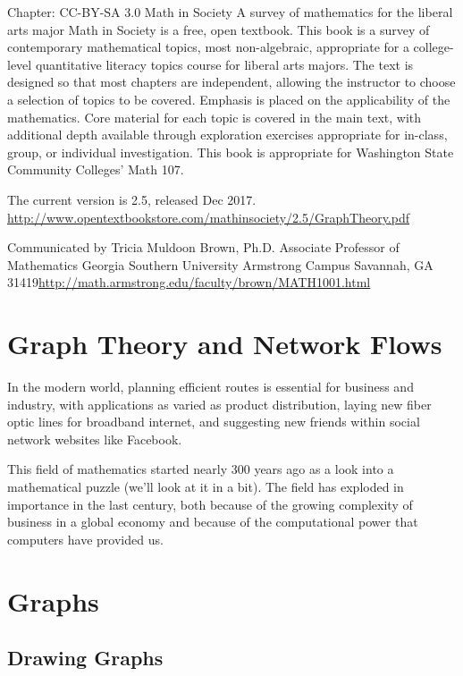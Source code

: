 \newcommand{\sout}{}
Chapter:
CC-BY-SA 3.0
Math in Society
A survey of mathematics for the liberal arts major
Math in Society is a free, open textbook. This book is a survey of contemporary mathematical topics, most non-algebraic, appropriate for a college-level quantitative literacy topics course for liberal arts majors. The text is designed so that most chapters are independent, allowing the instructor to choose a selection of topics to be covered. Emphasis is placed on the applicability of the mathematics. Core material for each topic is covered in the main text, with additional depth available through exploration exercises appropriate for in-class, group, or individual investigation. This book is appropriate for Washington State Community Colleges' Math 107.

The current version is 2.5, released Dec 2017.
\url{http://www.opentextbookstore.com/mathinsociety/2.5/GraphTheory.pdf}

Communicated by 
Tricia Muldoon Brown, Ph.D.
Associate Professor of Mathematics
Georgia Southern University
Armstrong Campus
Savannah, GA 31419\url{http://math.armstrong.edu/faculty/brown/MATH1001.html}

\section{Graph Theory and Network Flows}
In the modern world, planning efficient routes is essential for business and industry, with applications as varied as product distribution, laying new fiber optic lines for broadband internet, and suggesting new friends within social network websites like Facebook.

This field of mathematics started nearly 300 years ago as a look into a mathematical puzzle (we'll look at it in a bit).  The field has exploded in importance in the last century, both because of the growing complexity of business in a global economy and because of the computational power that computers have provided us.  
\section{Graphs}
\subsection{Drawing Graphs}

